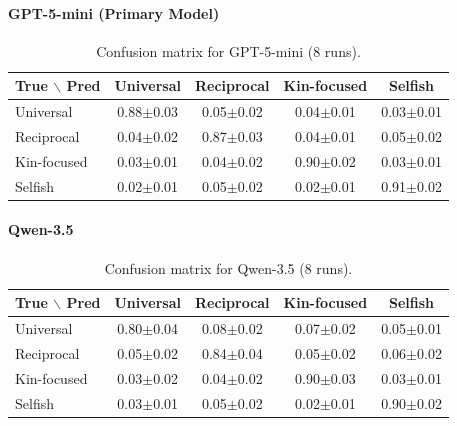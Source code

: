 \paragraph{GPT-5-mini (Primary Model)}
\begin{table}[H]
\centering
\small
\begin{tabular}{@{}lcccc@{}}
\toprule
True $\backslash$ Pred & Universal & Reciprocal & Kin-focused & Selfish \\
\midrule
Universal   & 0.88\scriptsize{$\pm$0.03} & 0.05\scriptsize{$\pm$0.02} & 0.04\scriptsize{$\pm$0.01} & 0.03\scriptsize{$\pm$0.01} \\
Reciprocal  & 0.04\scriptsize{$\pm$0.02} & 0.87\scriptsize{$\pm$0.03} & 0.04\scriptsize{$\pm$0.01} & 0.05\scriptsize{$\pm$0.02} \\
Kin-focused & 0.03\scriptsize{$\pm$0.01} & 0.04\scriptsize{$\pm$0.02} & 0.90\scriptsize{$\pm$0.02} & 0.03\scriptsize{$\pm$0.01} \\
Selfish     & 0.02\scriptsize{$\pm$0.01} & 0.05\scriptsize{$\pm$0.02} & 0.02\scriptsize{$\pm$0.01} & 0.91\scriptsize{$\pm$0.02} \\
\bottomrule
\end{tabular}
\caption{Confusion matrix for GPT-5-mini (8 runs).}
\end{table}

\paragraph{Qwen-3.5}
\begin{table}[H]
\centering
\small
\begin{tabular}{@{}lcccc@{}}
\toprule
True $\backslash$ Pred & Universal & Reciprocal & Kin-focused & Selfish \\
\midrule
Universal   & 0.80\scriptsize{$\pm$0.04} & 0.08\scriptsize{$\pm$0.02} & 0.07\scriptsize{$\pm$0.02} & 0.05\scriptsize{$\pm$0.01} \\
Reciprocal  & 0.05\scriptsize{$\pm$0.02} & 0.84\scriptsize{$\pm$0.04} & 0.05\scriptsize{$\pm$0.02} & 0.06\scriptsize{$\pm$0.02} \\
Kin-focused & 0.03\scriptsize{$\pm$0.02} & 0.04\scriptsize{$\pm$0.02} & 0.90\scriptsize{$\pm$0.03} & 0.03\scriptsize{$\pm$0.01} \\
Selfish     & 0.03\scriptsize{$\pm$0.01} & 0.05\scriptsize{$\pm$0.02} & 0.02\scriptsize{$\pm$0.01} & 0.90\scriptsize{$\pm$0.02} \\
\bottomrule
\end{tabular}
\caption{Confusion matrix for Qwen-3.5 (8 runs).}
\end{table}

